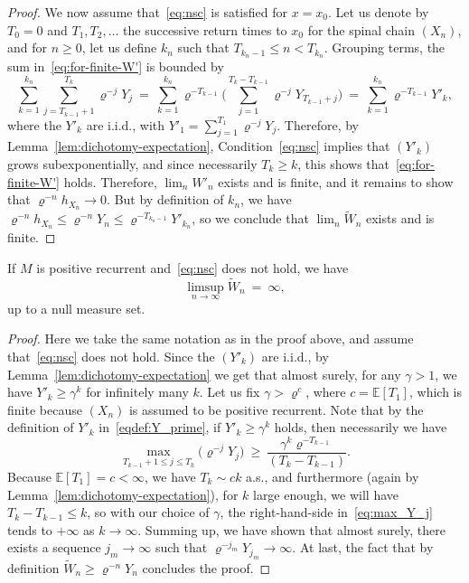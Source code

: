\begin{refsegment}
\begin{proof}
  We now assume that~\eqref{eq:nsc} is satisfied for $x=x_0$.
  Let us denote by $T_0=0$ and $T_1,T_2,\dots$ the successive return times to $x_0$ for the spinal chain $(X_n)$, and for $n\geq 0$, let us define $k_n$ such that $T_{k_n-1}\leq n < T_{k_n}$.
  Grouping terms, the sum in~\eqref{eq:for-finite-W'} is bounded by
  \begin{equation}\label{eqdef:Y_prime}
      \sum_{k=1}^{k_n}\sum_{j=T_{k-1}+1}^{T_k}\varrho^{-j}Y_j\ =\  \sum_{k=1}^{k_n}\varrho^{-T_{k-1}} \Big(\sum_{j=1}^{T_{k}-T_{k-1}}\varrho^{-j}Y_{T_{k-1}+j}\Big)\ =\ \sum_{k=1}^{k_n}\varrho^{-T_{k-1}} Y'_k,
  \end{equation}
  where the $Y'_k$ are i.i.d., with $Y'_1=\sum_{j=1}^{T_1}\varrho^{-j}Y_j$.
  Therefore, by Lemma~\ref{lem:dichotomy-expectation}, Condition~\eqref{eq:nsc} implies that $(Y'_k)$ grows subexponentially, and since necessarily $T_k\geq k$, this shows that~\eqref{eq:for-finite-W'} holds.
  Therefore, $\lim_n W'_n$ exists and is finite, and it remains to show that $\varrho^{-n}h_{X_n}\to 0$.
  But by definition of $k_n$, we have $\varrho^{-n}h_{X_n}\leq \varrho^{-n}Y_n \leq \varrho^{-T_{k_n-1}}Y'_{k_n}$, so we conclude that $\lim_n \widetilde{W}_n$ exists and is finite.
\end{proof}

\begin{prop}\label{prop:ks-necessary-part}
  If $M$ is positive recurrent and~\eqref{eq:nsc} does not hold, we have 
  \[
  \limsup_{n\to\infty}\widetilde{W}_n\ =\ \infty,
  \] up to a null measure set.
\end{prop}

\begin{proof}
  Here we take the same notation as in the proof above, and assume that~\eqref{eq:nsc} does not hold.
  Since the $(Y'_k)$ are i.i.d., by Lemma~\ref{lem:dichotomy-expectation} we get that almost surely, for any $\gamma>1$, we have $Y'_k \geq \gamma^{k}$ for infinitely many $k$.
  Let us fix $\gamma > \varrho^{c}$, where $c=\mathbb{E}[T_1]$, which is finite because $(X_n)$ is assumed to be positive recurrent.
  Note that by the definition of $Y'_k$ in~\eqref{eqdef:Y_prime}, if $Y'_k \geq \gamma^{k}$ holds, then necessarily we have
  \begin{equation}\label{eq:max_Y_j}
    \max_{T_{k-1}+1\leq j\leq T_k} \big(\varrho^{-j}Y_{j}\big)\ \geq\ \frac{\gamma^{k}\varrho^{-T_{k-1}}}{(T_{k}-T_{k-1})}.
\end{equation}
  Because $\mathbb{E}[T_1]=c<\infty$, we have $T_k\sim ck$ a.s., and furthermore (again by Lemma~\ref{lem:dichotomy-expectation}), for $k$ large enough, we will have $T_{k}-T_{k-1}\leq k$, so with our choice of $\gamma$, the right-hand-side in~\eqref{eq:max_Y_j} tends to $+\infty$ as $k\to \infty$.
  Summing up, we have shown that almost surely, there exists a sequence $j_m\to\infty $ such that $\varrho^{-j_m}Y_{j_m}\to \infty$. At last, the fact that by definition $\widetilde{W}_n \geq \varrho^{-n}Y_n$ concludes the proof.
\end{proof}


\end{refsegment}
